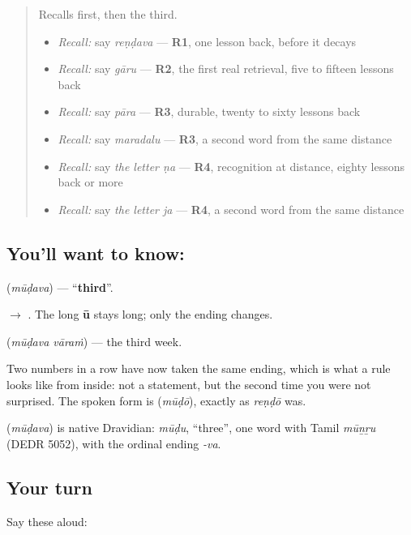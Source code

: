 \begin{quote}
Recalls first, then the third.

\begin{itemize}
\raggedright
  \item \emph{Recall:} say \emph{reṇḍava} — \textbf{R1}, one lesson back, before it decays
  \item \emph{Recall:} say \emph{gāru} — \textbf{R2}, the first real retrieval, five to fifteen lessons back
  \item \emph{Recall:} say \emph{pāra} — \textbf{R3}, durable, twenty to sixty lessons back
  \item \emph{Recall:} say \emph{maradalu} — \textbf{R3}, a second word from the same distance
  \item \emph{Recall:} say \emph{the letter ṇa} — \textbf{R4}, recognition at distance, eighty lessons back or more
  \item \emph{Recall:} say \emph{the letter ja} — \textbf{R4}, a second word from the same distance
\end{itemize}
\end{quote}

\subsection*{You'll want to know: }
\textbf{} (\emph{mūḍava}) — \textquotedblleft{}\textbf{third}\textquotedblright{}.

\textbf{} $\to$ \textbf{}. The long \textbf{ū} stays long; only the ending changes.

\textbf{ } (\emph{mūḍava vāraṁ}) — the third week.

Two numbers in a row have now taken the same ending, which is what a rule looks like from inside: not a statement, but the second time you were not surprised. The spoken form is \textbf{} (\emph{mūḍō}), exactly as \emph{reṇḍō} was.

\begin{cousinweb}
\textbf{} (\emph{mūḍava}) is native Dravidian: \emph{mūḍu}, \textquotedblleft{}three\textquotedblright{}, one word with Tamil \emph{mūṉṟu} (DEDR 5052), with the ordinal ending \emph{-va}.
\end{cousinweb}

\subsection*{Your turn}
Say these aloud:

